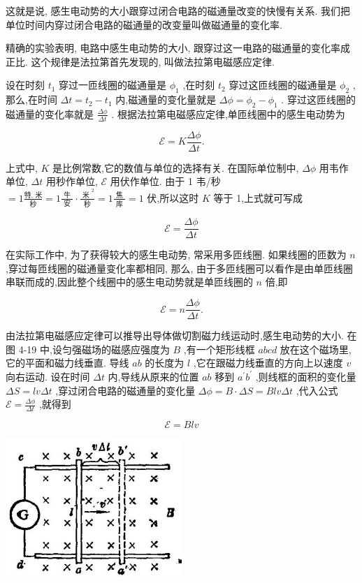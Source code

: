 \documentclass[10pt]{article}
\begin{document}
这就是说, 感生电动势的大小跟穿过闭合电路的磁通量改变的快慢有关系. 我们把单位时间内穿过闭合电路的磁通量的改变量叫做磁通量的变化率.

精确的实验表明, 电路中感生电动势的大小, 跟穿过这一电路的磁通量的变化率成正比. 这个规律是法拉第首先发现的, 叫做法拉第电磁感应定律.

设在时刻 \({t}_{1}\) 穿过一匝线圈的磁通量是 \({\phi }_{1}\) ,在时刻 \({t}_{2}\) 穿过这匝线圈的磁通量是 \({\phi }_{2}\) ,那么,在时间 \({\Delta t} = {t}_{2} - {t}_{1}\) 内,磁通量的变化量就是 \({\Delta \phi } = {\phi }_{2} - {\phi }_{1}\) . 穿过这匝线圈的磁通量的变化率就是 \(\frac{\Delta \phi }{\Delta t}\) . 根据法拉第电磁感应定律,单匝线圈中的感生电动势为

\[
\mathcal{E} = K\frac{\Delta \phi }{\Delta t}. \tag{1}
\]

上式中, \(K\) 是比例常数,它的数值与单位的选择有关. 在国际单位制中, \({\Delta \phi }\) 用韦作单位, \({\Delta t}\) 用秒作单位, \(\mathcal{E}\) 用伏作单位. 由于 1 韦/秒 \(= 1\frac{\text{特. 米}}{\text{秒}} = 1\frac{\text{ 牛 }}{\text{ 安 }} \cdot \frac{{\text{ 米 }}^{2}}{\text{ 秒 }} = 1\frac{\text{ 焦 }}{\text{ 库 }} = 1\) 伏,所以这时 \(K\) 等于 1,上式就可写成

\[
\mathcal{E} = \frac{\Delta \phi }{\Delta t}
\]

在实际工作中, 为了获得较大的感生电动势, 常采用多匝线圈. 如果线圈的匝数为 \(n\) ,穿过每匝线圈的磁通量变化率都相同, 那么, 由于多匝线圈可以看作是由单匝线圈串联而成的,因此整个线圈中的感生电动势就是单匝线圈的 \(n\) 倍,即

\[
\mathcal{E} = n\frac{\Delta \phi }{\Delta t}.
\]

由法拉第电磁感应定律可以推导出导体做切割磁力线运动时,感生电动势的大小. 在图 4-19 中,设匀强磁场的磁感应强度为 \(B\) ,有一个矩形线框 \({abcd}\) 放在这个磁场里,它的平面和磁力线垂直. 导线 \({ab}\) 的长度为 \(l\) ,它在跟磁力线垂直的方向上以速度 \(v\) 向右运动. 设在时间 \({\Delta t}\) 内,导线从原来的位置 \({ab}\) 移到 \({a}^{\prime }{b}^{\prime }\) ,则线框的面积的变化量 \({\Delta S} = {lv\Delta t}\) ,穿过闭合电路的磁通量的变化量 \({\Delta \phi } = B \cdot {\Delta S} = {Blv\Delta t}\) ,代入公式 \(\mathcal{E} = \frac{\Delta \phi }{\Delta t}\) ,就得到

\[
\mathcal{E} = {Blv} \tag{2}
\]

\begin{center}
\includegraphics[max width=0.5\textwidth]{images/01913056-1f15-74d8-9184-9aab52c9d66b_144_195764.jpg}
\end{center}
\end{document}
